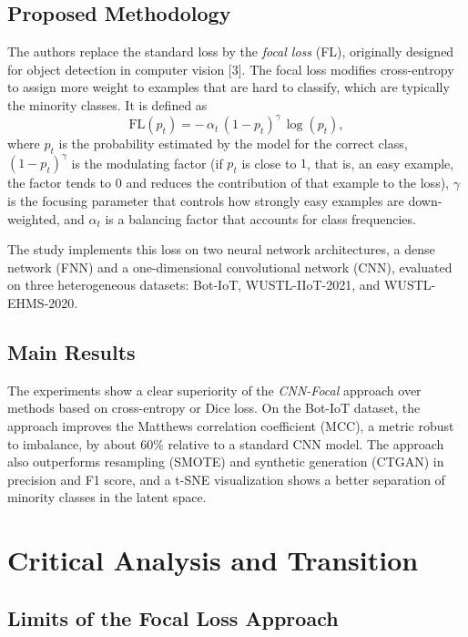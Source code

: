 \documentclass[11pt,a4paper]{article}
\begin{document}
\subsection{Proposed Methodology}

The authors replace the standard loss by the \emph{focal loss} (FL), originally designed for object detection in computer vision [3]. The focal loss modifies cross-entropy to assign more weight to examples that are hard to classify, which are typically the minority classes. It is defined as
\begin{equation}
\mathrm{FL}(p_t) = -\,\alpha_t\,(1-p_t)^{\gamma}\,\log(p_t),
\end{equation}
where $p_t$ is the probability estimated by the model for the correct class, $(1-p_t)^{\gamma}$ is the modulating factor (if $p_t$ is close to $1$, that is, an easy example, the factor tends to $0$ and reduces the contribution of that example to the loss), $\gamma$ is the focusing parameter that controls how strongly easy examples are down-weighted, and $\alpha_t$ is a balancing factor that accounts for class frequencies.

The study implements this loss on two neural network architectures, a dense network (FNN) and a one-dimensional convolutional network (CNN), evaluated on three heterogeneous datasets: Bot-IoT, WUSTL-IIoT-2021, and WUSTL-EHMS-2020.

\subsection{Main Results}

The experiments show a clear superiority of the \emph{CNN-Focal} approach over methods based on cross-entropy or Dice loss. On the Bot-IoT dataset, the approach improves the Matthews correlation coefficient (MCC), a metric robust to imbalance, by about $60\%$ relative to a standard CNN model. The approach also outperforms resampling (SMOTE) and synthetic generation (CTGAN) in precision and F1 score, and a t-SNE visualization shows a better separation of minority classes in the latent space.

\section{Critical Analysis and Transition}

\subsection{Limits of the Focal Loss Approach}
\end{document}
